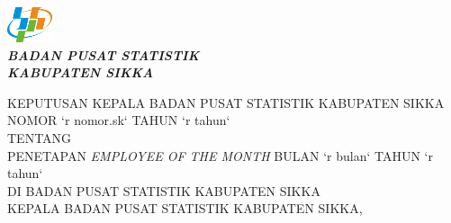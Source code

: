 \documentclass{article}
\begin{document}


\begin{center}
\includegraphics[width=0.10\textwidth]{logo/bps-logo.png}
\\
\textit{\textbf{
	\large{
	BADAN PUSAT STATISTIK
	\\
	KABUPATEN SIKKA
	}
}}

KEPUTUSAN KEPALA BADAN PUSAT STATISTIK
KABUPATEN SIKKA
\\
\bigskip
NOMOR `r nomor.sk` TAHUN `r tahun`
\\
\bigskip
TENTANG
\\
\bigskip
PENETAPAN \textit{EMPLOYEE OF THE MONTH} BULAN `r bulan` TAHUN `r tahun`
\\
\bigskip
DI BADAN PUSAT STATISTIK KABUPATEN SIKKA
\\
\bigskip
KEPALA BADAN PUSAT STATISTIK KABUPATEN SIKKA,

\end{center}

\end{document}
